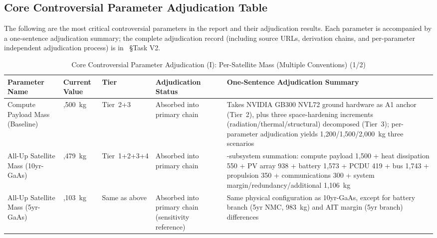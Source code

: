 \subsection{Core Controversial Parameter Adjudication Table}

The following are the most critical controversial parameters in the report and their adjudication results. Each parameter is accompanied by a one-sentence adjudication summary; the complete adjudication record (including source URLs, derivation chains, and per-parameter independent adjudication process) is in ~\S Task V2.

\begin{table}[H]
  \centering
  \caption{Core Controversial Parameter Adjudication (I): Per-Satellite Mass (Multiple Conventions) (1/2)}
  \label{tab:core-verdicts-mass-1}
  \footnotesize
  \begin{tabularx}{\textwidth}{
    >{\raggedright\arraybackslash}p{2.7cm}
    >{\raggedright\arraybackslash}p{2.2cm}
    >{\centering\arraybackslash}p{1.5cm}
    >{\raggedright\arraybackslash}p{2.1cm}
    >{\raggedright\arraybackslash}X
  }
  \toprule
  \textbf{Parameter Name} & \textbf{Current Value} & \textbf{Tier} & \textbf{Adjudication Status} & \textbf{One-Sentence Adjudication Summary} \\
  \midrule
  Compute Payload Mass (Baseline) & 1,500~kg & Tier~2+3 & Absorbed into primary chain & Takes NVIDIA GB300 NVL72 ground hardware as A1 anchor (Tier~2), plus three space-hardening increments (radiation/thermal/structural) decomposed (Tier~3); per-parameter adjudication yields 1,200/1,500/2,000~kg three scenarios \\
  All-Up Satellite Mass (10yr-GaAs) & 8,479~kg & Tier~1+2+3+4 & Absorbed into primary chain & 9-subsystem summation: compute payload 1,500 + heat dissipation 550 + PV array 938 + battery 1,573 + PCDU 419 + bus 1,743 + propulsion 350 + communications 300 + system margin/redundancy/additional 1,106~kg \\
  All-Up Satellite Mass (5yr-GaAs) & 7,103~kg & Same as above & Absorbed into primary chain (sensitivity reference) & Same physical configuration as 10yr-GaAs, except for battery branch (5yr NMC, 983~kg) and AIT margin (5yr branch) differences \\
  \bottomrule
  \end{tabularx}
\end{table}


